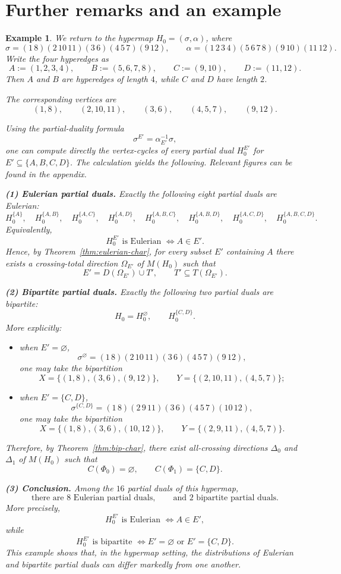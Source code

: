 \documentclass{article}
\newtheorem{example}[theorem]{Example}
\begin{document}
\section{Further remarks and an example}\label{sec:further-remarks}

\begin{example}
We return to the hypermap $H_0=(\sigma,\alpha)$, where
\[
\sigma=(1\,8)(2\,10\,11)(3\,6)(4\,5\,7)(9\,12),
\qquad
\alpha=(1\,2\,3\,4)(5\,6\,7\,8)(9\,10)(11\,12).
\]
Write the four hyperedges as
\[
A:=(1,2,3,4),\qquad B:=(5,6,7,8),\qquad C:=(9,10),\qquad D:=(11,12).
\]
Then $A$ and $B$ are hyperedges of length $4$, while $C$ and $D$ have length $2$.

The corresponding vertices are
\[
(1,8),\qquad (2,10,11),\qquad (3,6),\qquad (4,5,7),\qquad (9,12).
\]

Using the partial-duality formula
\[
\sigma^{E'}=\alpha_{E'}^{-1}\sigma,
\]
one can compute directly the vertex-cycles of every partial dual $H_0^{E'}$ for $E'\subseteq\{A,B,C,D\}$. The calculation yields the following. Relevant figures can be found in the appendix.

\medskip
\noindent\textbf{(1) Eulerian partial duals.}
Exactly the following eight partial duals are Eulerian:
\[
H_0^{\{A\}},\quad
H_0^{\{A,B\}},\quad
H_0^{\{A,C\}},\quad
H_0^{\{A,D\}},\quad
H_0^{\{A,B,C\}},\quad
H_0^{\{A,B,D\}},\quad
H_0^{\{A,C,D\}},\quad
H_0^{\{A,B,C,D\}}.
\]
Equivalently,
\[
H_0^{E'} \text{ is Eulerian } \iff A\in E'.
\]
Hence, by Theorem~\ref{thm:eulerian-char}, for every subset $E'$ containing $A$ there exists a crossing-total direction $\Omega_{E'}$ of $M(H_0)$ such that
\[
E'=D(\Omega_{E'})\cup T',\qquad T'\subseteq T(\Omega_{E'}).
\]

\medskip
\noindent\textbf{(2) Bipartite partial duals.}
Exactly the following two partial duals are bipartite:
\[
H_0=H_0^{\varnothing},\qquad H_0^{\{C,D\}}.
\]
More explicitly:
\begin{itemize}
  \item when $E'=\varnothing$,
  \[
  \sigma^{\varnothing}=(1\,8)(2\,10\,11)(3\,6)(4\,5\,7)(9\,12),
  \]
  one may take the bipartition
  \[
  X=\{(1,8),(3,6),(9,12)\},
  \qquad
  Y=\{(2,10,11),(4,5,7)\};
  \]
  \item when $E'=\{C,D\}$,
  \[
  \sigma^{\{C,D\}}=(1\,8)(2\,9\,11)(3\,6)(4\,5\,7)(10\,12),
  \]
  one may take the bipartition
  \[
  X=\{(1,8),(3,6),(10,12)\},
  \qquad
  Y=\{(2,9,11),(4,5,7)\}.
  \]
\end{itemize}
Therefore, by Theorem~\ref{thm:bip-char}, there exist all-crossing directions $\Delta_0$ and $\Delta_1$ of $M(H_0)$ such that
\[
C(\Phi_0)=\varnothing,
\qquad
C(\Phi_1)=\{C,D\}.
\]

\medskip
\noindent\textbf{(3) Conclusion.}
Among the $16$ partial duals of this hypermap,
\[
\text{there are }8\text{ Eulerian partial duals},
\qquad
\text{and }2\text{ bipartite partial duals}.
\]
More precisely,
\[
H_0^{E'} \text{ is Eulerian } \iff A\in E',
\]
while
\[
H_0^{E'} \text{ is bipartite } \iff E'=\varnothing \text{ or } E'=\{C,D\}.
\]
This example shows that, in the hypermap setting, the distributions of Eulerian and bipartite partial duals can differ markedly from one another.
\end{example}
\end{document}
